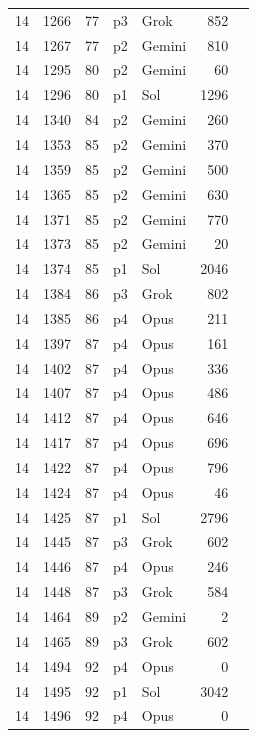 \begin{longtable}{r r r l l r L{2.3in}}
14 & 1266 & 77 & p3 & Grok & 852 &  \\
14 & 1267 & 77 & p2 & Gemini & 810 &  \\
14 & 1295 & 80 & p2 & Gemini & 60 &  \\
14 & 1296 & 80 & p1 & Sol & 1296 &  \\
14 & 1340 & 84 & p2 & Gemini & 260 &  \\
14 & 1353 & 85 & p2 & Gemini & 370 &  \\
14 & 1359 & 85 & p2 & Gemini & 500 &  \\
14 & 1365 & 85 & p2 & Gemini & 630 &  \\
14 & 1371 & 85 & p2 & Gemini & 770 &  \\
14 & 1373 & 85 & p2 & Gemini & 20 &  \\
14 & 1374 & 85 & p1 & Sol & 2046 &  \\
14 & 1384 & 86 & p3 & Grok & 802 &  \\
14 & 1385 & 86 & p4 & Opus & 211 &  \\
14 & 1397 & 87 & p4 & Opus & 161 &  \\
14 & 1402 & 87 & p4 & Opus & 336 &  \\
14 & 1407 & 87 & p4 & Opus & 486 &  \\
14 & 1412 & 87 & p4 & Opus & 646 &  \\
14 & 1417 & 87 & p4 & Opus & 696 &  \\
14 & 1422 & 87 & p4 & Opus & 796 &  \\
14 & 1424 & 87 & p4 & Opus & 46 &  \\
14 & 1425 & 87 & p1 & Sol & 2796 &  \\
14 & 1445 & 87 & p3 & Grok & 602 &  \\
14 & 1446 & 87 & p4 & Opus & 246 &  \\
14 & 1448 & 87 & p3 & Grok & 584 &  \\
14 & 1464 & 89 & p2 & Gemini & 2 &  \\
14 & 1465 & 89 & p3 & Grok & 602 &  \\
14 & 1494 & 92 & p4 & Opus & 0 &  \\
14 & 1495 & 92 & p1 & Sol & 3042 &  \\
14 & 1496 & 92 & p4 & Opus & 0 &  \\

\end{longtable}
